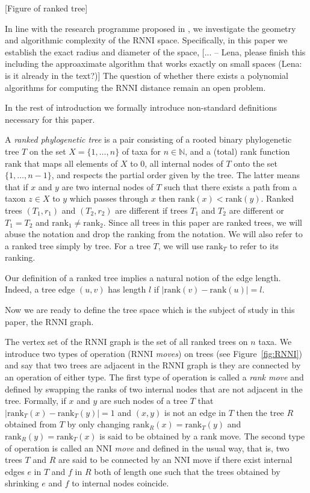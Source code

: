 \documentclass{amsart}
\newcommand{\rank}{\mathrm{rank}}
\newcommand{\nni}{\mathrm{NNI}}
\newcommand{\rnni}{\mathrm{RNNI}}
\begin{document}
[Figure of ranked tree]

In line with the research programme proposed in \autocite{Gavryushkin2018-ol}, we investigate the geometry and algorithmic complexity of the $\rnni$ space.
Specifically, in this paper we establish the exact radius and diameter of the space, [... -- Lena, please finish this including the approaximate algorithm that works exactly on small spaces (Lena: is it already in the text?)]
The question of whether there exists a polynomial algorithms for computing the $\rnni$ distance remain an open problem.

In the rest of introduction we formally introduce non-standard definitions necessary for this paper.

A \emph{ranked phylogenetic tree} is a pair consisting of a rooted binary phylogenetic tree $T$ on the set $X = \{1, \ldots, n\}$ of taxa for $n \in \mathbb N$, and a (total) rank function $\rank$ that maps all elements of $X$ to $0$, all internal nodes of $T$ onto the set $\{1, \ldots, n-1\}$, and respects the partial order given by the tree.
The latter means that if $x$ and $y$ are two internal nodes of $T$ such that there exists a path from a taxon $z \in X$ to $y$ which passes through $x$ then $\rank(x) < \rank(y)$.
Ranked trees $(T_1, r_1)$ and $(T_2, r_2)$ are different if trees $T_1$ and $T_2$ are different or $T_1 = T_2$ and $\rank_1 \neq \rank_2$.
Since all trees in this paper are ranked trees, we will abuse the notation and drop the ranking from the notation.
We will also refer to a ranked tree simply by tree.
For a tree $T$, we will use $\rank_T$ to refer to its ranking.

Our definition of a ranked tree implies a natural notion of the edge length.
Indeed, a tree edge $(u,v)$ has length $l$ if $|\rank(v) - \rank(u)| = l$.

Now we are ready to define the tree space which is the subject of study in this paper, the $\rnni$ graph.

The vertex set of the $\rnni$ graph is the set of all ranked trees on $n$ taxa.
We introduce two types of operation ($\rnni$ \emph{moves}) on trees (see Figure~\ref{fig:RNNI}) and say that two trees are adjacent in the $\rnni$ graph is they are connected by an operation of either type.
The first type of operation is called a \emph{rank move} and defined by swapping the ranks of two internal nodes that are not adjacent in the tree.
Formally, if $x$ and $y$ are such nodes of a tree $T$ that $|\rank_T(x) - \rank_T(y)| = 1$ and $(x, y)$ is not an edge in $T$ then the tree $R$ obtained from $T$ by only changing $\rank_R(x) = \rank_T(y)$ and $\rank_R(y) = \rank_T(x)$ is said to be obtained by a rank move.
The second type of operation is called an $\nni$ \emph{move} and defined in the usual way, that is, two trees $T$ and $R$ are said to be connected by an $\nni$ move if there exist internal edges $e$ in $T$ and $f$ in $R$ both of length one such that the trees obtained by shrinking $e$ and $f$ to internal nodes coincide.
\end{document}
